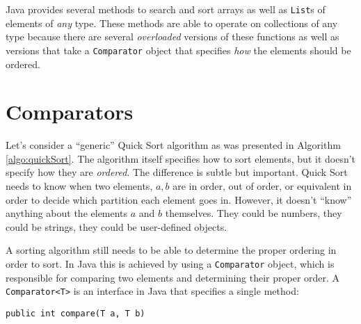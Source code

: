 

Java provides several methods to search and sort arrays as well as 
\texttt{List}s of elements of \emph{any} type.  These
methods are able to operate on collections of any type because there
are several 
\emph{overloaded} versions of these functions as well as
versions that take a \texttt{Comparator} object that specifies
\emph{how} the elements should be ordered.

\section{Comparators}

Let's consider a ``generic'' Quick Sort algorithm as was presented in
Algorithm \ref{algo:quickSort}.  The algorithm itself specifies how to 
sort elements, but it doesn't specify how they are \emph{ordered}.  The 
difference is subtle but important.  Quick Sort needs to 
know when two elements, $a, b$ are in order, out of order, or equivalent 
in order to decide which partition each element goes in.  However, it 
doesn't ``know'' anything about the elements $a$ and $b$ themselves.  
They could be numbers, they could be strings, they could be user-defined 
objects.  

A sorting algorithm still needs to be able to determine the proper ordering 
in order to sort.  In Java this is achieved by using a 
\texttt{Comparator} object, which is responsible for comparing 
two elements and determining their proper order.  A \texttt{Comparator<T>}
is an interface in Java that specifies a single method: 

\texttt{public int compare(T a, T b)}

